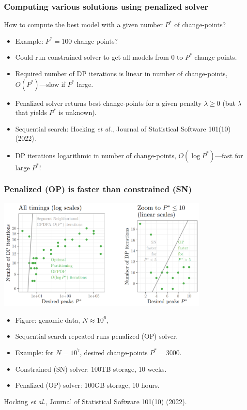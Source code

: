 \documentclass{beamer}
\begin{document}
\begin{frame}
  \frametitle{Computing various solutions using penalized solver}

  How to compute the best model with a given number $P^*$ of change-points? 
  

  \begin{itemize}
  \item Example: $P^*=100$ change-points?
  \item Could run constrained solver to get all models from 0 to $P^*$ change-points.
  \item Required number of DP iterations is linear in number of change-points, $O(P^*)$---slow if $P^*$ large.
  \item Penalized solver returns best change-points for a given
    penalty $\lambda\geq 0$ (but $\lambda$ that yields $P^*$ is
    unknown).
  \item Sequential search: Hocking \emph{et al.}, Journal of Statistical Software 101(10) (2022).
  \item DP iterations logarithmic in number of change-points, $O(\log P^*)$---fast for large $P^*$!
  \end{itemize}
  
\end{frame}

\begin{frame}
  \frametitle{Penalized (OP) is faster than constrained (SN)}
  
  \includegraphics[width=0.8\textwidth]{figure-OP-faster-than-SN.png}

  \begin{itemize}
  \item Figure: genomic data, $N\approx 10^6$, 
  \item Sequential search repeated runs penalized (OP) solver.
  \item Example: for $N=10^7$, desired change-points $P^*=3000$.
  \item Constrained (SN) solver: 100TB storage, 10 weeks.
  \item Penalized (OP) solver: 100GB storage, 10 hours.
  \end{itemize}
  Hocking \emph{et al.}, Journal of Statistical Software 101(10) (2022).
\end{frame}
\end{document}
